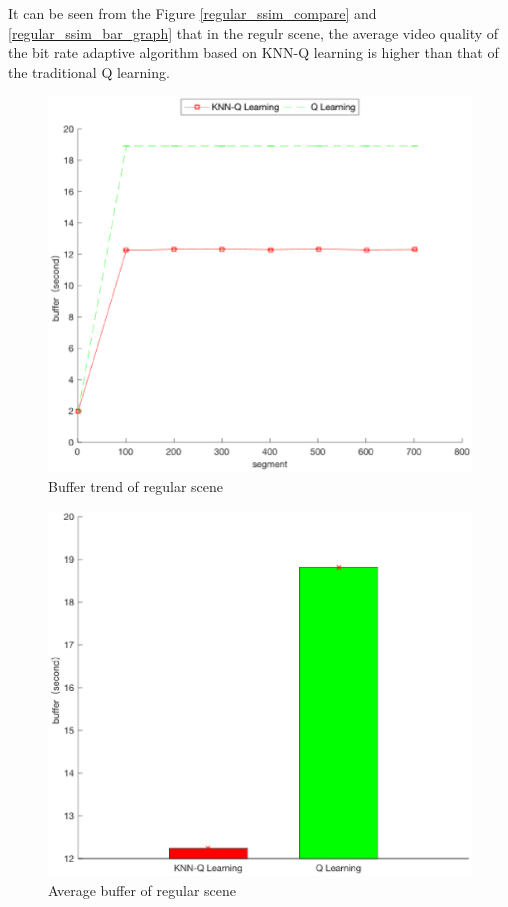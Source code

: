 \documentclass[twocolumn]{article}
\begin{document}
It can be seen from the Figure \ref{regular_ssim_compare} and \ref{regular_ssim_bar_graph} that in the regulr scene, 
the average video quality of the bit rate adaptive algorithm based on KNN-Q 
learning is higher than that of the traditional Q learning.
\begin{figure}[htbp]
\centering
\includegraphics[width=\columnwidth]{regular_buffer_compare}
\caption{Buffer trend of regular scene}
\label{regular_buffer_compare}
\end{figure}
\begin{figure}[htbp]
\centering
\includegraphics[width=\columnwidth]{regular_buffer_bar_graph}
\caption{Average buffer of regular scene}
\label{regular_buffer_bar_graph}
\end{figure}
\end{document}
